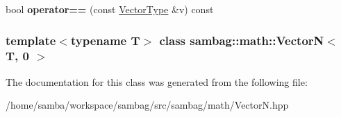 \begin{DoxyCompactItemize}
\item 
\hypertarget{classsambag_1_1math_1_1_vector_n_3_01_t_00_010_01_4_a27c2e492c8f82307a138af3cb21742ab}{
bool {\bfseries operator==} (const \hyperlink{classsambag_1_1math_1_1_vector_n}{VectorType} \&v) const }
\label{classsambag_1_1math_1_1_vector_n_3_01_t_00_010_01_4_a27c2e492c8f82307a138af3cb21742ab}

\end{DoxyCompactItemize}
\subsubsection*{template$<$typename T$>$ class sambag::math::VectorN$<$ T, 0 $>$}



The documentation for this class was generated from the following file:\begin{DoxyCompactItemize}
\item 
/home/samba/workspace/sambag/src/sambag/math/VectorN.hpp\end{DoxyCompactItemize}
